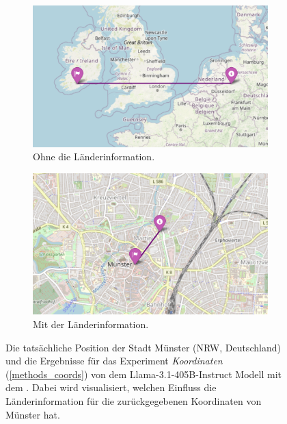 \begin{figure} %
    \centering
    \begin{subfigure}{.5\textwidth}
      \centering
      \includegraphics[width=.95\linewidth]{img/Karte-Muenster.png}
      \caption{Ohne die Länderinformation.}
      \label{fig_res_muenster}
    \end{subfigure}%
    \begin{subfigure}{.5\textwidth}
      \centering
      \includegraphics[width=.95\linewidth]{img/Karte-Muenster-country.png}
      \caption{Mit der Länderinformation.}
      \label{fig_res_muenster_country}
    \end{subfigure}
    \caption{Die tatsächliche Position der Stadt Münster (NRW, Deutschland) und die Ergebnisse für das Experiment \textit{Koordinaten} (\ref{methods_coords}) von dem Llama-3.1-405B-Instruct Modell mit dem \jsonv{}. Dabei wird visualisiert, welchen Einfluss die Länderinformation für die zurückgegebenen Koordinaten von Münster hat.}
    \label{fig_res_muenster_total}
\end{figure}

